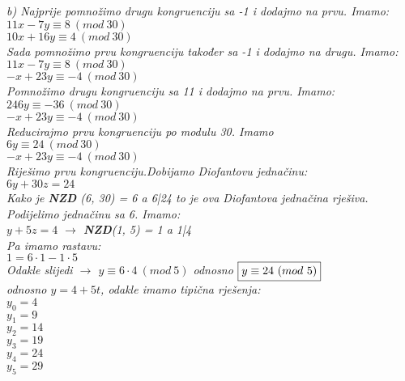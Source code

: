 \documentclass[12pt]{article}
\begin{document}
\begin{enumerate}
\begin{center}
         \textit{b) Najprije pomnožimo drugu kongruenciju sa -1 i dodajmo na prvu. Imamo:\\
         $11x - 7y \equiv 8 \ (mod\ 30)$\\
         $10x + 16y \equiv 4 \ (mod\ 30)$\\}
            \vspace*{0.25cm}
            \textit{Sada pomnožimo prvu kongruenciju također sa -1 i dodajmo na drugu. Imamo:\\
            $11x - 7y \equiv 8 \ (mod\ 30)$\\
            $-x + 23y \equiv -4 \ (mod\ 30)$\\
            }
            \vspace*{0.25cm}
            \textit{Pomnožimo drugu kongruenciju sa 11 i dodajmo na prvu. Imamo:\\
            $246y \equiv -36 \ (mod\ 30)$\\
            $-x + 23y \equiv -4 \ (mod\ 30)$\\
            }
            \vspace*{0.25cm}
            \textit{Reducirajmo prvu kongruenciju po modulu 30. Imamo\\
            $6y \equiv 24 \ (mod\ 30)$\\
            $-x + 23y \equiv -4 \ (mod\ 30)$\\
            }
            \vspace*{0.25cm}
            \textit{Riješimo prvu kongruenciju.Dobijamo Diofantovu jednačinu: \\$6y + 30z = 24$\\ Kako je \textbf{NZD} (6, 30) = 6 a 6|24 to je ova Diofantova jednačina rješiva. Podijelimo jednačinu sa 6. Imamo:\\
            $y + 5z = 4$ $\rightarrow$ \textbf{NZD}(1, 5) = 1 a 1|4\\
            Pa imamo rastavu:\\
            $1 = 6 \cdot 1 - 1 \cdot 5$\\
            Odakle slijedi $\rightarrow$ $y \equiv 6 \cdot 4 \ (mod\ 5)$
            odnosno $\fbox{$y \equiv 24 \ (mod\ 5)$}$\\
            \vspace{0.15cm}
            odnosno $y = 4 + 5t$, odakle imamo tipična  rješenja:\\
            \vspace{0.15cm}
            $y_0 = 4$\\
            $y_1 = 9$\\
            $y_2 = 14$\\
            $y_3 = 19$\\
            $y_4 = 24$\\
            $y_5 = 29$\\}


\end{center}
\end{enumerate}
\end{document}
